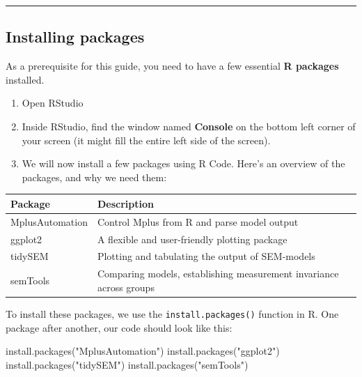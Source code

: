 \documentclass[
]{book}
\newenvironment{Shaded}{\begin{snugshade}}{\end{snugshade}}
\newcommand{\FunctionTok}[1]{\textcolor[rgb]{0.00,0.00,0.00}{#1}}
\newcommand{\NormalTok}[1]{#1}
\newcommand{\StringTok}[1]{\textcolor[rgb]{0.31,0.60,0.02}{#1}}
\providecommand{\tightlist}{%
  \setlength{\itemsep}{0pt}\setlength{\parskip}{0pt}}
\begin{document}
\begin{center}\rule{0.5\linewidth}{0.5pt}\end{center}

\hypertarget{installpackages}{%
\subsection{Installing packages}\label{installpackages}}

As a prerequisite for this guide, you need to have a few essential \textbf{R packages} installed.

\begin{enumerate}
\def\labelenumi{\arabic{enumi}.}
\tightlist
\item
  Open RStudio
\item
  Inside RStudio, find the window named \textbf{Console} on the bottom left corner of your screen (it might fill the entire left side of the screen).
\item
  We will now install a few packages using R Code. Here's an overview of the packages, and why we need them:
\end{enumerate}

\begin{tabular}{l|l}
\hline
Package & Description\\
\hline
MplusAutomation & Control Mplus from R and parse model output\\
\hline
ggplot2 & A flexible and user-friendly plotting package\\
\hline
tidySEM & Plotting and tabulating the output of SEM-models\\
\hline
semTools & Comparing models, establishing measurement invariance across groups\\
\hline
\end{tabular}

To install these packages, we use the \texttt{install.packages()} function in R. One package after another, our code should look like this:

\begin{Shaded}
\begin{Highlighting}[]
\FunctionTok{install.packages}\NormalTok{(}\StringTok{"MplusAutomation"}\NormalTok{)}
\FunctionTok{install.packages}\NormalTok{(}\StringTok{"ggplot2"}\NormalTok{)}
\FunctionTok{install.packages}\NormalTok{(}\StringTok{"tidySEM"}\NormalTok{)}
\FunctionTok{install.packages}\NormalTok{(}\StringTok{"semTools"}\NormalTok{)}
\end{Highlighting}
\end{Shaded}
\end{document}
